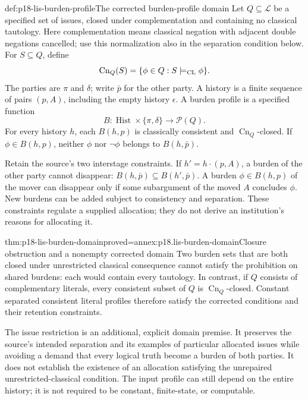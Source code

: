 \begin{hbdefinition}{def:p18-lis-burden-profile}{The corrected burden-profile domain}
Let \(Q\subseteq\mathcal L\) be a specified set of issues, closed
under complementation and containing no classical tautology.
Here complementation means classical negation with adjacent
double negations cancelled; use this normalization also in the
separation condition below.
For \(S\subseteq Q\), define
\[
\operatorname{Cn}_Q(S)=
 \{\phi\in Q:S\models_{\rm CL}\phi\}.
\]
The parties are \(\pi\) and \(\delta\); write \(\bar p\) for
the other party.
A history is a finite sequence of pairs \((p,A)\), including the
empty history \(\epsilon\).
A burden profile is a specified function
\[
B:\operatorname{Hist}\times\{\pi,\delta\}\longrightarrow\mathcal P(Q).
\]
For every history \(h\), each \(B(h,p)\) is classically consistent
and \(\operatorname{Cn}_Q\)-closed.
If \(\phi\in B(h,p)\), neither \(\phi\) nor \(\neg\phi\) belongs
to \(B(h,\bar p)\).

Retain the source's two interstage constraints.
If \(h'=h\cdot(p,A)\), a burden of the other party cannot disappear:
\(B(h,\bar p)\subseteq B(h',\bar p)\).
A burden \(\phi\in B(h,p)\) of the mover can disappear only if
some subargument of the moved \(A\) concludes \(\phi\).
New burdens can be added subject to consistency and separation.
These constraints regulate a supplied allocation; they do not
derive an institution's reasons for allocating it.
\end{hbdefinition}

\begin{hbtheorem}{thm:p18-lis-burden-domain}{proved=annex:p18.lis-burden-domain}{Closure obstruction and a nonempty corrected domain}
Two burden sets that are both closed under unrestricted classical
consequence cannot satisfy the prohibition on shared burdens:
each would contain every tautology.
In contrast, if \(Q\) consists of complementary literals, every
consistent subset of \(Q\) is \(\operatorname{Cn}_Q\)-closed.
Constant separated consistent literal profiles therefore satisfy
the corrected conditions and their retention constraints.
\end{hbtheorem}

The issue restriction is an additional, explicit domain premise.
It preserves the source's intended separation and its examples of
particular allocated issues while avoiding a demand that every logical
truth become a burden of both parties.
It does not establish the existence of an allocation satisfying
the unrepaired unrestricted-classical condition.
The input profile can still depend on the entire history; it is
not required to be constant, finite-state, or computable.

